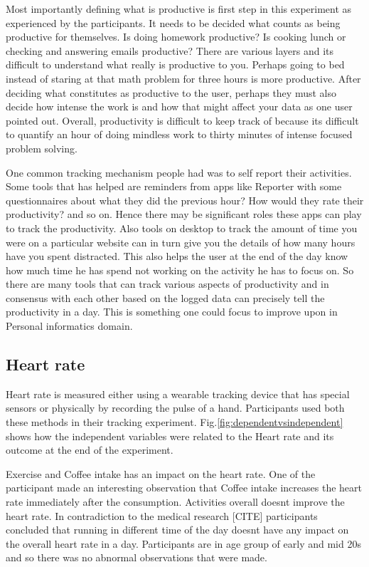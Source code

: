 Most importantly defining what is productive is first step in this experiment as experienced by the participants. It needs to be decided what counts as being productive for themselves. Is doing homework productive? Is cooking lunch or checking and answering emails productive? There are various layers and it\textquotesingle s difficult to understand what really is productive to you. Perhaps going to bed instead of staring at that math problem for three hours is more productive. After deciding what constitutes as productive to the user, perhaps they must also decide how intense the work is and how that might affect your data as one user pointed out. Overall, productivity is difficult to keep track of because it\textquotesingle s difficult to quantify an hour of doing mindless work to thirty minutes of intense focused problem solving. 

One common tracking mechanism people had was to self report their activities. Some tools that has helped are reminders from apps like Reporter with some questionnaires about what they did the previous hour? How would they rate their productivity? and so on. Hence there may be significant roles these apps can play to track the productivity. Also tools on desktop to track the amount of time you were on a particular website can in turn give you the details of how many hours have you spent distracted. This also helps the user at the end of the day know how much time he has spend not working on the activity he has to focus on. So there are many tools that can track various aspects of productivity and in consensus with each other based on the logged data can precisely tell the productivity in a day. This is something one could focus to improve upon in Personal informatics domain.

\subsection{Heart rate}
Heart rate is measured either using a wearable tracking device that has special sensors or physically by recording the pulse of a hand. Participants used both these methods in their tracking experiment. 
Fig.\ref{fig:dependentvsindependent} shows how the independent variables were related to the Heart rate and its outcome at the end of the experiment.

Exercise and Coffee intake has an impact on the heart rate. One of the participant made an interesting observation that Coffee intake increases the heart rate immediately after the consumption. Activities overall doesn\textquotesingle t improve the heart rate. In contradiction to the medical research [CITE] participants concluded that running in different time of the day doesn\textquotesingle t have any impact on the overall heart rate in a day. Participants are in age group of early and mid 20s and so there was no abnormal observations that were made. 

